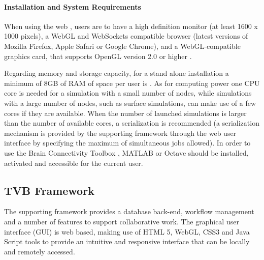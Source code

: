 \documentclass{bioinfo}
\begin{document}
\begin{methods}
    \paragraph*{Installation and System Requirements}
    
    When using the web , users are
     to have a high  definition monitor (at
    least 1600 x 1000 pixels), a WebGL and WebSockets  compatible browser
    (latest versions of Mozilla Firefox, Apple Safari or  Google Chrome), and
    a WebGL-compatible graphics card, that supports OpenGL version 2.0 or
    higher \citep{opengl-redbook}.
    
    Regarding memory and storage capacity, for a stand alone installation a
    minimum of 8GB of RAM    
     of space per user is
    .  As for computing power one CPU core is needed
    for a simulation with a small number of nodes, while simulations with a
    large number of nodes, such as surface simulations, can make use of a few
    cores if they are available.  When the number of launched simulations is
    larger than the number of  available cores, a serialization is recommended
    (a serialization mechanism  is provided by the supporting framework
    through the web user interface by specifying the maximum of simultaneous
    jobs allowed).  In order to use the Brain Connectivity Toolbox
    \citep{Rubinov_2010},  MATLAB or Octave should be installed, activated and
    accessible for the  current user. 


  \subsection{TVB Framework}\label{subsec:TVBFramework}
    
    The supporting framework provides a database back-end, workflow management
    and a number of features to support collaborative work.  The graphical user interface (GUI) is web based,
    making use of HTML 5, WebGL, CSS3 and Java  Script \citep{Bostock_2011}
    tools to provide an intuitive and responsive  interface that can be
    locally and remotely accessed.
    

\end{methods}
\end{document}
